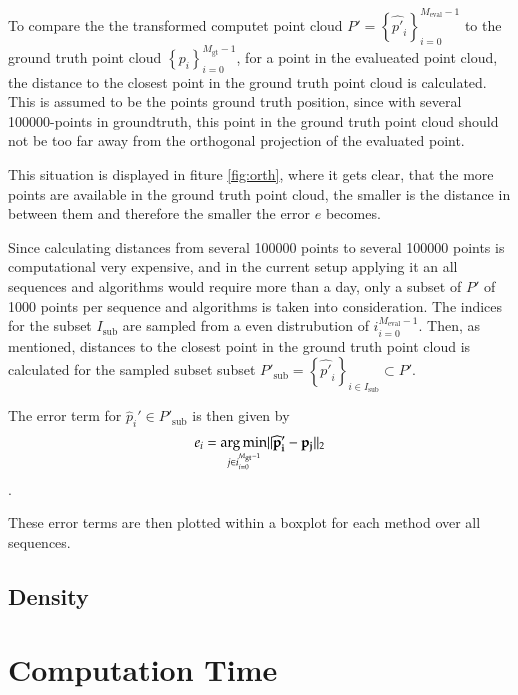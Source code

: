 	To compare the the transformed computet point cloud $P' = \left\{{\widehat{p'}_i}\right\}_{i=0}^{M_{\text{eval}}-1}$ to the ground truth point cloud
	$\left\{p_i\right\}_{i=0}^{M_{\text{gt}}-1}$, for a point in the evalueated point cloud, the distance to the closest point in the ground truth
	point cloud is calculated. This is assumed to be the points ground truth position, since with several 100000-points in groundtruth, this point in 
	the ground truth point cloud should not be too far away from the orthogonal projection of the evaluated point. 
	
	
	This situation is displayed in fiture \ref{fig:orth}, where it gets clear, that the more points are available in the ground truth point cloud, 
	the smaller is the distance in between them and therefore the smaller the error $e$ becomes.

	Since calculating distances from several 100000 points to several 100000 points is computational very expensive, and in the current setup applying 
	it an all sequences and algorithms would require more than a day, only a subset of $P'$ of 1000 points per sequence and algorithms
	is taken into consideration. The indices for the subset $I_{\text{sub}}$ are sampled from a even distrubution of ${i}_{i = 0}^{M_{\text{eval}}-1}$. 
	Then, as mentioned, distances to the closest point in the ground truth point cloud is calculated for the sampled subset subset 
	$P'_{\text{sub}} = \left\{{\widehat{p'}_i}\right\}_{i \in I_{\text{sub}}} \subset P'$. 
	
	The error term for $\widehat{p}_i' \in P'_{\text{sub}}$ is then given by
	$$ e_i = \mathop{\mathrm{arg\,min}}_{j \in {i}_{i=0}^{M_{\text{gt}}-1}} \lVert \mathbf{\widehat{p}_i' - p_j} \rVert_2 $$.
	
	These error terms are then plotted within a boxplot for each method over all sequences. 
	
	\subsection{Density}
	
	
	
	
	

\section{Computation Time}
	
